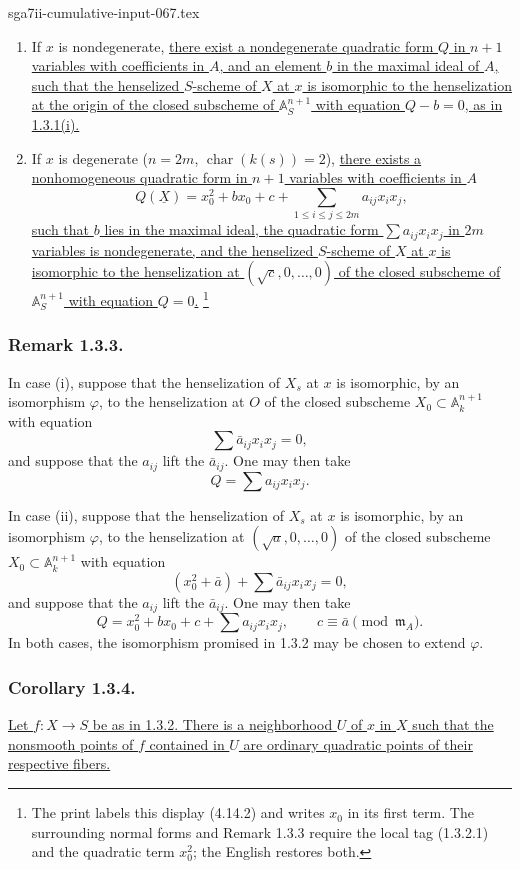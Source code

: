 \begin{filecontents*}{sga7ii-cumulative-input-067.tex}
\begin{enumerate}[label=(\roman*),leftmargin=2.6em]
\item If $x$ is nondegenerate, \underline{there exist a
nondegenerate quadratic form $Q$ in $n+1$ variables with
coefficients in $A$, and an element $b$ in the maximal ideal of $A$,
such that the henselized $S$-scheme of $X$ at $x$ is isomorphic to
the henselization at the origin of the closed subscheme of
$\mathbb A_S^{n+1}$ with equation $Q-b=0$, as in 1.3.1(i).}

\item If $x$ is degenerate
($n=2m$, $\operatorname{char}(k(s))=2$), \underline{there exists a
nonhomogeneous quadratic form in $n+1$ variables with coefficients
in $A$}
\begin{equation}\tag{1.3.2.1}
Q(\underline X)=x_0^2+b x_0+c+
 \sum_{1\leq i\leq j\leq 2m}a_{ij}x_i x_j,
\end{equation}
\underline{such that $b$ lies in the maximal ideal, the quadratic
form $\sum a_{ij}x_i x_j$ in $2m$ variables is nondegenerate, and
the henselized $S$-scheme of $X$ at $x$ is isomorphic to the
henselization at $(\sqrt c,0,\ldots,0)$ of the closed subscheme of
$\mathbb A_S^{n+1}$ with equation $Q=0$.}
\footnote{The print labels this display (4.14.2) and writes $x_0$ in
its first term.  The surrounding normal forms and Remark 1.3.3
require the local tag (1.3.2.1) and the quadratic term $x_0^2$; the
English restores both.}
\end{enumerate}

\subsubsection*{Remark 1.3.3.}
In case (i), suppose that the henselization of $X_s$ at $x$ is
isomorphic, by an isomorphism $\varphi$, to the henselization at $O$
of the closed subscheme
$X_0\subset\mathbb A_k^{n+1}$ with equation
\[
\sum\bar a_{ij}x_i x_j=0,
\]
and suppose that the $a_{ij}$ lift the $\bar a_{ij}$.  One may then
take
\[
Q=\sum a_{ij}x_i x_j.
\]

In case (ii), suppose that the henselization of $X_s$ at $x$ is
isomorphic, by an isomorphism $\varphi$, to the henselization at
$(\sqrt a,0,\ldots,0)$ of the closed subscheme
$X_0\subset\mathbb A_k^{n+1}$ with equation
\[
(x_0^2+\bar a)+\sum\bar a_{ij}x_i x_j=0,
\]
and suppose that the $a_{ij}$ lift the $\bar a_{ij}$.  One may then
take
\[
Q=x_0^2+b x_0+c+\sum a_{ij}x_i x_j,
\qquad c\equiv\bar a\pmod{\mathfrak m_A}.
\]
In both cases, the isomorphism promised in 1.3.2 may be chosen to
extend $\varphi$.

\subsubsection*{Corollary 1.3.4.}
\underline{Let $f:X\to S$ be as in 1.3.2.  There is a neighborhood
$U$ of $x$ in $X$ such that the nonsmooth points of $f$ contained in
$U$ are ordinary quadratic points of their respective fibers.}
\end{filecontents*}

